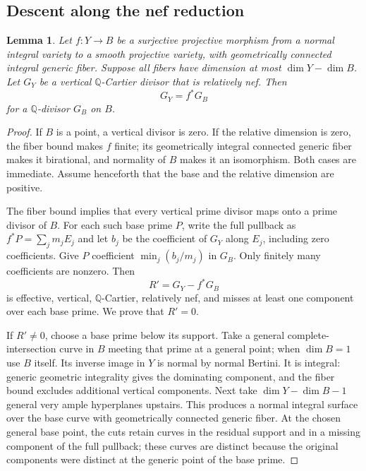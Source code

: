 \documentclass[11pt,letterpaper]{article}
\newtheorem{lemma}[theorem]{Lemma}
\theoremstyle{definition}
\theoremstyle{remark}
\begin{document}
\subsection{Descent along the nef reduction}

\begin{lemma}\label{proj:sg:vertical-descent}
Let $f:Y\to B$ be a surjective projective morphism from a
normal integral variety to a smooth projective variety,
with geometrically connected integral generic fiber.
Suppose all fibers have dimension at most
$\dim Y-\dim B$.  Let $G_Y$ be a vertical $\mathbb{Q}$-Cartier
divisor that is relatively nef.  Then
\[
 G_Y=f^*G_B
\]
for a $\mathbb{Q}$-divisor $G_B$ on $B$.
\end{lemma}

\begin{proof}
If $B$ is a point, a vertical divisor is zero.  If the
relative dimension is zero, the fiber bound makes $f$
finite; its geometrically integral connected generic
fiber makes it birational, and normality of $B$ makes
it an isomorphism.  Both cases are immediate.  Assume
henceforth that the base and the relative dimension
are positive.

The fiber bound implies that every vertical prime divisor
maps onto a prime divisor of $B$.  For each such base
prime $P$, write the full pullback as
$f^*P=\sum_jm_jE_j$ and let $b_j$ be the coefficient of
$G_Y$ along $E_j$, including zero coefficients.
Give $P$ coefficient $\min_j(b_j/m_j)$ in $G_B$.
Only finitely many coefficients are nonzero.  Then
\[
 R'=G_Y-f^*G_B
\]
is effective, vertical, $\mathbb{Q}$-Cartier, relatively nef,
and misses at least one component over each base prime.
We prove that $R'=0$.

If $R'\ne0$, choose a base prime below its support.
Take a general complete-intersection curve in $B$
meeting that prime at a general point; when $\dim B=1$
use $B$ itself.  Its inverse image in $Y$ is normal
by normal Bertini.  It is integral: generic geometric
integrality gives the dominating component, and the
fiber bound excludes additional vertical components.
Next take $\dim Y-\dim B-1$ general very ample
hyperplanes upstairs.  This produces a normal integral
surface over the base curve with geometrically connected
generic fiber.  At the chosen general base point,
the cuts retain curves in the residual support and in
a missing component of the full pullback; these curves
are distinct because the original components were
distinct at the generic point of the base prime.


\end{proof}
\end{document}

